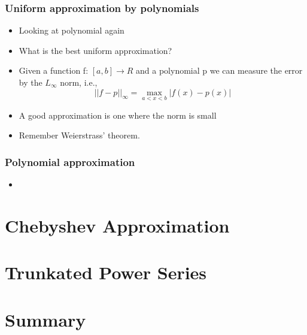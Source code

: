 \documentclass[10pt]{beamer}
\begin{document}
\begin{frame}
  \frametitle{Uniform approximation by polynomials}
  \begin{itemize}
  \item Looking at polynomial again
  \item What is the best uniform approximation? 
  \item Given a function f: $[a,b] \rightarrow R$ and a polynomial p we can measure the error by the $L_{\infty}$ norm, i.e.,
    \[
      ||f-p||_{\infty} = \max_{a<x<b} | f(x) - p(x) |
    \]
  \item A good approximation is one where the norm is small
  \item Remember Weierstrass' theorem. 
  \end{itemize}
\end{frame}

\begin{frame}
  \frametitle{Polynomial approximation}
  \begin{itemize}
  \item 
  \end{itemize}
\end{frame}
\section{Chebyshev Approximation}

\section{Trunkated Power Series}

\section{Summary}
\end{document}
